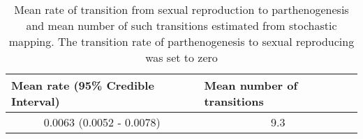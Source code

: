 \begin{table}
\centering
\begin{tabular}{ll}
\hline
\textbf{Mean rate (95\% Credible Interval)}  & \textbf{Mean number of transitions} \\ \hline
\multicolumn{1}{c}{0.0063 (0.0052 - 0.0078)} & \multicolumn{1}{c}{9.3}             \\ \hline
\end{tabular}
\caption{Mean rate of transition from sexual reproduction to parthenogenesis and mean number of 
such transitions estimated from stochastic mapping. The transition rate of parthenogenesis to sexual reproducing was set to zero}
\label{tab:phas.simmap.summary}
\end{table}
